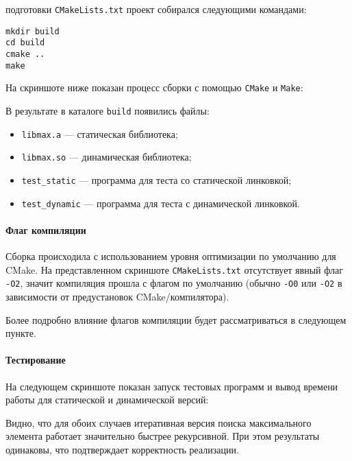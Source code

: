 \vspace{0.5em}
 подготовки \texttt{CMakeLists.txt} проект собирался следующими командами:
\begin{lstlisting}
mkdir build
cd build
cmake ..
make
\end{lstlisting}
На скриншоте ниже показан процесс сборки с помощью \texttt{CMake} и \texttt{Make}:


\vspace{0.5em}
В результате в каталоге \texttt{build} появились файлы:
\begin{itemize}
\item \texttt{libmax.a} — статическая библиотека;
\item \texttt{libmax.so} — динамическая библиотека;
\item \texttt{test\_static} — программа для теста со статической линковкой;
\item \texttt{test\_dynamic} — программа для теста с динамической линковкой.
\end{itemize}

\paragraph{Флаг компиляции}
Сборка происходила с использованием уровня оптимизации по умолчанию для CMake. На представленном скриншоте \texttt{CMakeLists.txt} отсутствует явный флаг \texttt{-O2}, значит компиляция прошла с флагом по умолчанию (обычно \texttt{-O0} или \texttt{-O2} в зависимости от предустановок CMake/компилятора).

Более подробно влияние флагов компиляции будет рассматриваться в следующем пункте.

\vspace{0.5em}
\paragraph{Тестирование}
На следующем скриншоте показан запуск тестовых программ и вывод времени работы для статической и динамической версий:


Видно, что для обоих случаев итеративная версия поиска максимального элемента работает значительно быстрее рекурсивной. При этом результаты одинаковы, что подтверждает корректность реализации.

